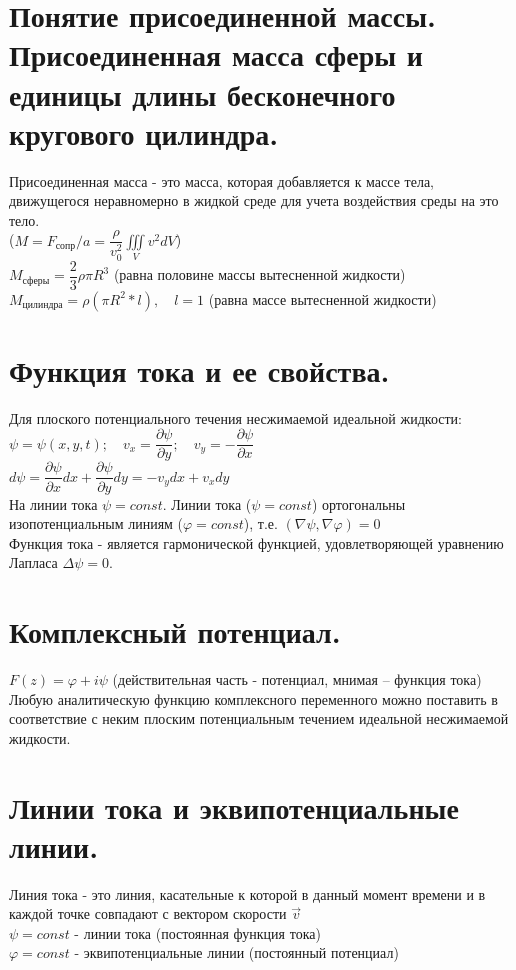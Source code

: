 \begin{multicols*}{2}
		\section{Понятие присоединенной массы. Присоединенная масса сферы и единицы длины бесконечного кругового цилиндра.}
		Присоединенная масса - это масса, которая добавляется к массе тела, движущегося неравномерно в жидкой среде для учета воздействия среды на это тело. \\
		($M=F_\text{сопр}/a = \dfrac{\rho}{v^2_0}\iiint\limits_{V} v^2dV $) \\
		$M_\text{сферы}=\dfrac{2}{3}\rho\pi R^3$ (равна половине массы вытесненной жидкости)\\
		$M_\text{цилиндра}=\rho(\pi R^2*l),\quad l = 1$ (равна массе вытесненной жидкости)
		
		\section{Функция тока и ее свойства.}
		Для плоского потенциального течения несжимаемой идеальной жидкости: \\
		$\psi = \psi (x, y, t); \quad v_{x}=\dfrac{\partial\psi}{\partial y}; \quad v_{y}=-\dfrac{\partial\psi}{\partial x}$ \\
		$d\psi = \dfrac{\partial\psi}{\partial x}dx + \dfrac{\partial\psi}{\partial y}dy = -v_{y}dx + v_{x}dy$\\
		На линии тока $\psi = const$. Линии тока ($\psi = const$) ортогональны изопотенциальным линиям ($\varphi = const$), т.е. $(\nabla\psi, \nabla\varphi)=0$\\
		Функция тока - является гармонической функцией, удовлетворяющей уравнению Лапласа $\Delta \psi = 0$. 
		
		\section{Комплексный потенциал.}
		$F(z)=\varphi+i\psi$ (действительная часть - потенциал, мнимая – функция тока)\\
		Любую аналитическую функцию комплексного переменного можно поставить в соответствие с неким плоским потенциальным течением идеальной несжимаемой жидкости.
		
		\section{Линии тока и эквипотенциальные линии.}
		Линия тока - это линия, касательные к которой в данный момент времени и в каждой точке совпадают с вектором скорости  $\vec{v}$ \\
		$\psi = const$ - линии тока (постоянная функция тока) \\
		$\varphi = const$ - эквипотенциальные линии (постоянный потенциал)
		

\end{multicols*}

